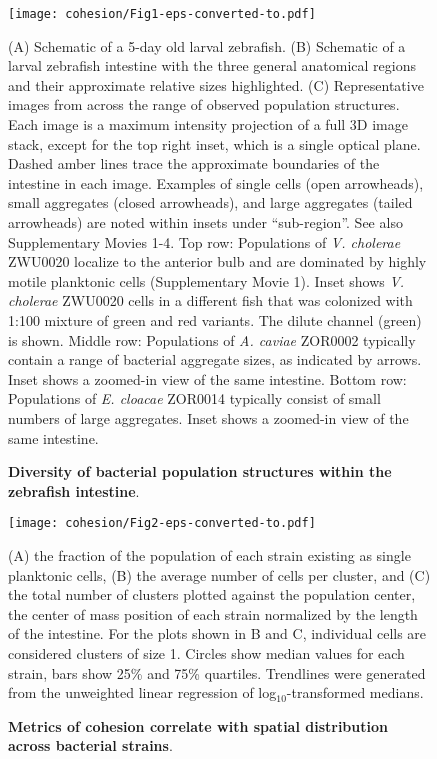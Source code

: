 \begin{figure}%
\centerline{
	\texttt{[image: cohesion/Fig1-eps-converted-to.pdf]}}
	\caption{\textbf{Diversity of bacterial population structures within the zebrafish intestine}.}{(A) Schematic of a 5-day old larval zebrafish. (B) Schematic of a larval zebrafish intestine with the three general anatomical regions and their approximate relative sizes highlighted. (C) Representative images from across the range of observed population structures. Each image is a maximum intensity projection of a full 3D image stack, except for the top right inset, which is a single optical plane. Dashed amber lines trace the approximate boundaries of the intestine in each image. Examples of single cells (open arrowheads), small aggregates (closed arrowheads), and large aggregates (tailed arrowheads) are noted within insets under ``sub-region''. See also Supplementary Movies 1-4.  Top row: Populations of \textit{V. cholerae} ZWU0020 localize to the anterior bulb and are dominated by highly motile planktonic cells (Supplementary Movie 1). Inset shows \textit{V. cholerae} ZWU0020 cells in a different fish that was colonized with 1:100 mixture of green and red variants. The dilute channel (green) is shown. Middle row: Populations of \textit{A. caviae} ZOR0002 typically contain a range of bacterial aggregate sizes, as indicated by arrows. Inset shows a zoomed-in view of the same intestine. Bottom row: Populations of \textit{E. cloacae} ZOR0014 typically consist of small numbers of large aggregates. Inset shows a zoomed-in view of the same intestine.}
\end{figure}

\begin{figure}%
\centerline{
	\texttt{[image: cohesion/Fig2-eps-converted-to.pdf]}}
	\caption{\textbf{Metrics of cohesion correlate with spatial distribution  across bacterial strains}.} {(A) the fraction of the population of each strain existing as single planktonic cells, (B) the average number of cells per cluster, and (C) the total number of clusters plotted against the population center, the center of mass position of each strain normalized by the length of the intestine. For the plots shown in B and C, individual cells are considered clusters of size 1. Circles show median values for each strain, bars show 25\% and 75\% quartiles. Trendlines were generated from the unweighted linear regression of log$_{10}$-transformed medians.}
\end{figure}

